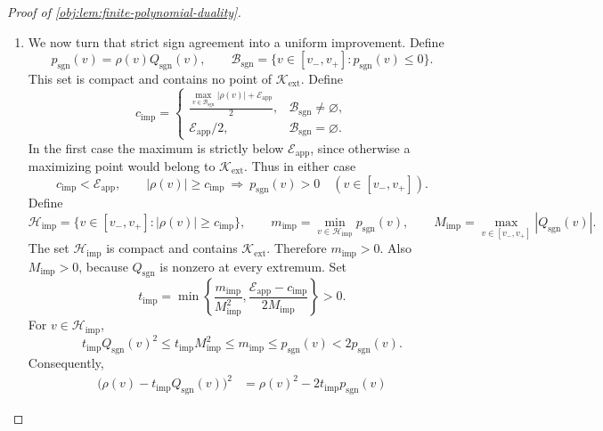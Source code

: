 \documentclass[11pt]{article}
\begin{document}
\begin{proof}[Proof of \cref{obj:lem:finite-polynomial-duality}]
\begin{enumerate}
For any \(v\in\mathcal K_{\mathrm{ext}}\), choose a covering center \(c_j\). Opposite signs at \(v\) and \(c_j\) would imply
\[
|v-c_j|>\delta_{\mathrm{ext}},
\]
contradicting \(|v-c_j|<\varepsilon_{\mathrm{ext}}\). Hence
\[
\rho(v)=s_j\mathcal E_{\mathrm{app}},
\qquad
\rho(v)Q_{\mathrm{sgn}}(v)
=
\mathcal E_{\mathrm{app}}\,s_jQ_{\mathrm{sgn}}(v)>0.
\]
This completes the sign-polynomial construction.

\item We now turn that strict sign agreement into a uniform improvement. Define
\[
p_{\mathrm{sgn}}(v)=\rho(v)Q_{\mathrm{sgn}}(v),
\qquad
\mathcal B_{\mathrm{sgn}}
=
\{v\in[v_-,v_+]:p_{\mathrm{sgn}}(v)\le0\}.
\]
This set is compact and contains no point of \(\mathcal K_{\mathrm{ext}}\). Define
\[
c_{\mathrm{imp}}
=
\begin{cases}
\displaystyle
\frac{\max_{v\in\mathcal B_{\mathrm{sgn}}}|\rho(v)|
+\mathcal E_{\mathrm{app}}}{2},
&\mathcal B_{\mathrm{sgn}}\ne\varnothing,\\[3mm]
\mathcal E_{\mathrm{app}}/2,
&\mathcal B_{\mathrm{sgn}}=\varnothing.
\end{cases}
\]
In the first case the maximum is strictly below \(\mathcal E_{\mathrm{app}}\), since otherwise a maximizing point would belong to \(\mathcal K_{\mathrm{ext}}\). Thus in either case
\[
c_{\mathrm{imp}}<\mathcal E_{\mathrm{app}},
\qquad
|\rho(v)|\ge c_{\mathrm{imp}}
\ \Longrightarrow\
p_{\mathrm{sgn}}(v)>0
\quad(v\in[v_-,v_+]).
\]
Define
\begingroup\small
\[
\mathcal H_{\mathrm{imp}}
=
\{v\in[v_-,v_+]:|\rho(v)|\ge c_{\mathrm{imp}}\},
\qquad
m_{\mathrm{imp}}
=
\min_{v\in\mathcal H_{\mathrm{imp}}}p_{\mathrm{sgn}}(v),
\qquad
M_{\mathrm{imp}}
=
\max_{v\in[v_-,v_+]}|Q_{\mathrm{sgn}}(v)|.
\]
\endgroup
The set \(\mathcal H_{\mathrm{imp}}\) is compact and contains \(\mathcal K_{\mathrm{ext}}\). Therefore \(m_{\mathrm{imp}}>0\). Also \(M_{\mathrm{imp}}>0\), because \(Q_{\mathrm{sgn}}\) is nonzero at every extremum. Set
\[
t_{\mathrm{imp}}
=
\min\left\{
\frac{m_{\mathrm{imp}}}{M_{\mathrm{imp}}^2},
\frac{\mathcal E_{\mathrm{app}}-c_{\mathrm{imp}}}{2M_{\mathrm{imp}}}
\right\}>0.
\]
For \(v\in\mathcal H_{\mathrm{imp}}\),
\[
t_{\mathrm{imp}}Q_{\mathrm{sgn}}(v)^2
\le t_{\mathrm{imp}}M_{\mathrm{imp}}^2
\le m_{\mathrm{imp}}
\le p_{\mathrm{sgn}}(v)
<2p_{\mathrm{sgn}}(v).
\]
Consequently,
\[
\begin{aligned}
\bigl(\rho(v)-t_{\mathrm{imp}}Q_{\mathrm{sgn}}(v)\bigr)^2
&=\rho(v)^2-2t_{\mathrm{imp}}p_{\mathrm{sgn}}(v)

\end{aligned}\]
\end{enumerate}
\end{proof}
\end{document}
